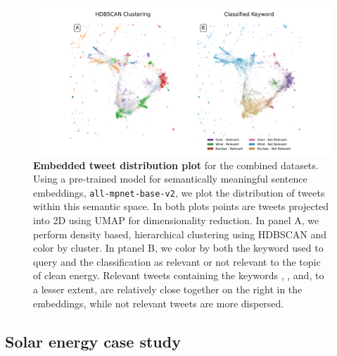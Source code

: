 

\begin{figure}
  \centerfloat	
        \includegraphics[width=2.8\columnwidth]{figures/combined_labeled_embedding_horizontal.png} 
  \caption{\textbf{Embedded tweet distribution plot} for the combined datasets.
  Using a pre-trained model for semantically meaningful sentence embeddings, \texttt{all-mpnet-base-v2}, we plot the distribution of tweets within this semantic space.
  In both plots points are tweets projected into 2D using UMAP for dimensionality reduction.
  In panel A, we perform density based, hierarchical clustering using HDBSCAN and color by cluster.
  In ptanel B, we color by both the keyword used to query and the classification as relevant or not relevant to the topic of clean energy. 
  Relevant tweets containing the keywords , , and, to a lesser extent,  are relatively close together on the right in the embeddings, while not relevant tweets are more dispersed.} 
    \label{fig:combined_embeddings}
\end{figure}

\subsection{Solar energy case study}
\label{sec:corpusCreation.results.solar}


